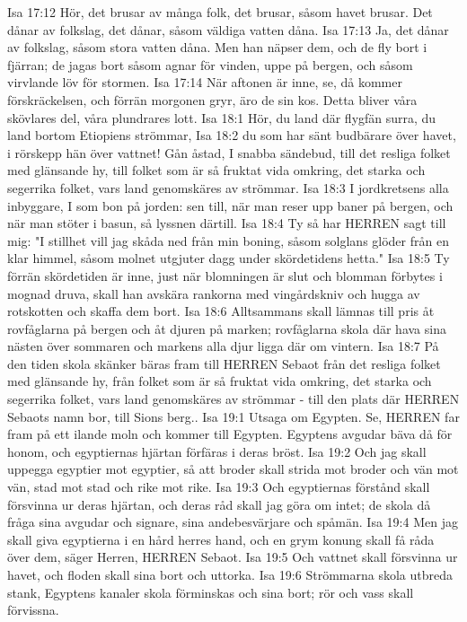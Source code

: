 Isa 17:12  Hör, det brusar av många folk, det brusar, såsom havet brusar. Det dånar av folkslag, det dånar, såsom väldiga vatten dåna.
Isa 17:13  Ja, det dånar av folkslag, såsom stora vatten dåna. Men han näpser dem, och de fly bort i fjärran; de jagas bort såsom agnar för vinden, uppe på bergen, och såsom virvlande löv för stormen.
Isa 17:14  När aftonen är inne, se, då kommer förskräckelsen, och förrän morgonen gryr, äro de sin kos. Detta bliver våra skövlares del, våra plundrares lott.
Isa 18:1  Hör, du land där flygfän surra, du land bortom Etiopiens strömmar,
Isa 18:2  du som har sänt budbärare över havet, i rörskepp hän över vattnet! Gån åstad, I snabba sändebud, till det resliga folket med glänsande hy, till folket som är så fruktat vida omkring, det starka och segerrika folket, vars land genomskäres av strömmar.
Isa 18:3  I jordkretsens alla inbyggare, I som bon på jorden: sen till, när man reser upp baner på bergen, och när man stöter i basun, så lyssnen därtill.
Isa 18:4  Ty så har HERREN sagt till mig: "I stillhet vill jag skåda ned från min boning, såsom solglans glöder från en klar himmel, såsom molnet utgjuter dagg under skördetidens hetta."
Isa 18:5  Ty förrän skördetiden är inne, just när blomningen är slut och blomman förbytes i mognad druva, skall han avskära rankorna med vingårdskniv och hugga av rotskotten och skaffa dem bort.
Isa 18:6  Alltsammans skall lämnas till pris åt rovfåglarna på bergen och åt djuren på marken; rovfåglarna skola där hava sina nästen över sommaren och markens alla djur ligga där om vintern.
Isa 18:7  På den tiden skola skänker bäras fram till HERREN Sebaot från det resliga folket med glänsande hy, från folket som är så fruktat vida omkring, det starka och segerrika folket, vars land genomskäres av strömmar - till den plats där HERREN Sebaots namn bor, till Sions berg..
Isa 19:1  Utsaga om Egypten. Se, HERREN far fram på ett ilande moln och kommer till Egypten. Egyptens avgudar bäva då för honom, och egyptiernas hjärtan förfäras i deras bröst.
Isa 19:2  Och jag skall uppegga egyptier mot egyptier, så att broder skall strida mot broder och vän mot vän, stad mot stad och rike mot rike.
Isa 19:3  Och egyptiernas förstånd skall försvinna ur deras hjärtan, och deras råd skall jag göra om intet; de skola då fråga sina avgudar och signare, sina andebesvärjare och spåmän.
Isa 19:4  Men jag skall giva egyptierna i en hård herres hand, och en grym konung skall få råda över dem, säger Herren, HERREN Sebaot.
Isa 19:5  Och vattnet skall försvinna ur havet, och floden skall sina bort och uttorka.
Isa 19:6  Strömmarna skola utbreda stank, Egyptens kanaler skola förminskas och sina bort; rör och vass skall förvissna.
